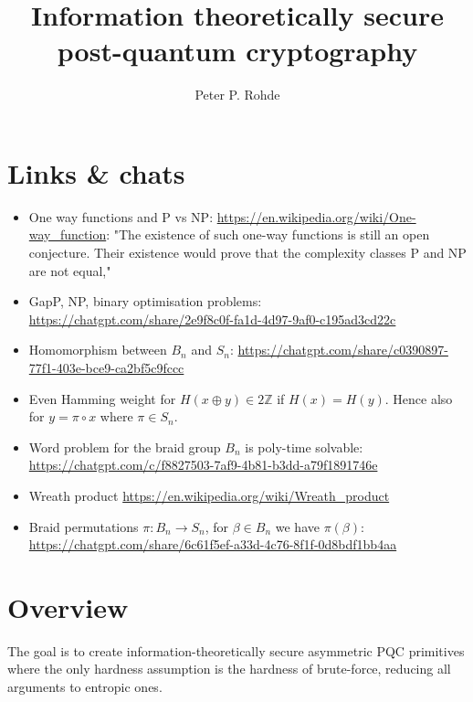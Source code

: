 \documentclass[twocolumn, aps, amsmath, amssymb, nofootinbib, superscriptaddress, longbibliography, doublefloatfix, table-of-contents, eqsecnum, rmp]{revtex4-2}
\begin{document}
\title{Information theoretically secure post-quantum cryptography}

\author{Peter P. Rohde}

\begin{abstract}
\end{abstract}

\maketitle


\section{Links \& chats}

\begin{itemize}
	\item One way functions and P vs NP: \url{https://en.wikipedia.org/wiki/One-way_function}: "The existence of such one-way functions is still an open conjecture. Their existence would prove that the complexity classes P and NP are not equal,"
	\item GapP, NP, binary optimisation problems: \url{https://chatgpt.com/share/2e9f8c0f-fa1d-4d97-9af0-c195ad3cd22c}
	\item Homomorphism between $B_n$ and $S_n$: \url{https://chatgpt.com/share/c0390897-77f1-403e-bce9-ca2bf5c9fccc}
	\item Even Hamming weight for $H(x\oplus y)\in 2\mathbb{Z}$ if $H(x)=H(y)$. Hence also for $y=\pi\circ x$ where $\pi\in S_n$.
	\item Word problem for the braid group $B_n$ is poly-time solvable: \url{https://chatgpt.com/c/f8827503-7af9-4b81-b3dd-a79f1891746e}
	\item Wreath product \url{https://en.wikipedia.org/wiki/Wreath_product}
	\item Braid permutations \mbox{$\pi: B_n \to S_n$}, for $\beta\in B_n$ we have $\pi(\beta)$: \url{https://chatgpt.com/share/6c61f5ef-a33d-4c76-8f1f-0d8bdf1bb4aa}
\end{itemize}

\section{Overview}

The goal is to create information-theoretically secure asymmetric PQC primitives where the only hardness assumption is the hardness of brute-force, reducing all arguments to entropic ones.
\end{document}

